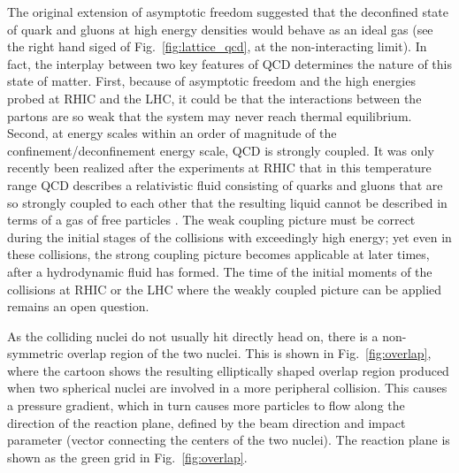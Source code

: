 The original extension of asymptotic freedom suggested that the deconfined state of quark and gluons at high energy densities would behave as an ideal gas (see the right hand siged of Fig.~\ref{fig:lattice_qcd}, at the non-interacting limit). In fact, the interplay between two key features of QCD determines the nature of this state of matter. First, because of asymptotic freedom and the high energies probed at RHIC and the LHC, it could be that the interactions between the partons are so weak that the system may never reach thermal equilibrium. Second, at energy scales within an order of magnitude of the confinement/deconfinement energy scale, QCD is strongly coupled. It was only recently been realized after the experiments at RHIC that in this temperature range QCD describes a relativistic fluid consisting of quarks and gluons that are so strongly coupled to each other that the resulting liquid cannot be described in terms of a gas of free particles \cite{ADCOX2005184,ADAMS2005102,BACK200528,ARSENE20051}. The weak coupling picture must be correct during the initial stages of the collisions with exceedingly high energy; yet even in these collisions, the strong coupling picture becomes applicable at later times, after a hydrodynamic fluid has formed. The time of the initial moments of the collisions at RHIC or the LHC where the weakly coupled picture can be applied remains an open question.


As the colliding nuclei do not usually hit directly head on, there is a non-symmetric overlap region of the two nuclei. This is shown in Fig.~\ref{fig:overlap}, where the cartoon shows the resulting elliptically shaped overlap region produced when two spherical nuclei are involved in a more peripheral collision. This causes a pressure gradient, which in turn causes more particles to flow along the direction of the reaction plane, defined by the beam direction and impact parameter (vector connecting the centers of the two nuclei). The reaction plane is shown as the green grid in Fig.~\ref{fig:overlap}.

